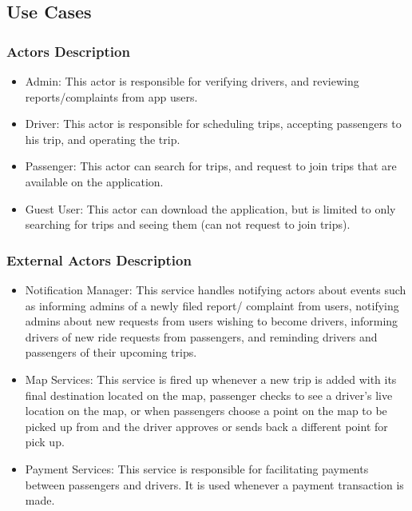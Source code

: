 \documentclass[a4paper, 12pt]{report} %
\begin{document}
    \subsection{Use Cases}
        \subsubsection{Actors Description}
            \begin{itemize}
                \item Admin: This actor is responsible for verifying drivers, and reviewing reports/complaints from app users.
                \item Driver: This actor is responsible for scheduling trips, accepting passengers to his trip, and operating the trip.
                \item Passenger: This actor can search for trips, and request to join trips that are available on the application.
                \item Guest User: This actor can download the application, but is limited to only searching for trips and seeing them (can not request to join trips).
            \end{itemize}
        \subsubsection{External Actors Description}
            \begin{itemize}
                \item Notification Manager: This service handles notifying actors about events such as informing admins of a newly filed report/ complaint from users, notifying admins about new requests from users wishing to become drivers, informing drivers of new ride requests from passengers, and reminding drivers and passengers of their upcoming trips.
                \item Map Services: This service is fired up whenever a new trip is added with its final destination located on the map, passenger checks to see a driver’s live location on the map, or when passengers choose a point on the map to be picked up from and the driver approves or sends back a different point for pick up.
                \item Payment Services: This service is responsible for facilitating payments between passengers and drivers. It is used whenever a payment transaction is made.
            \end{itemize}
\end{document}
